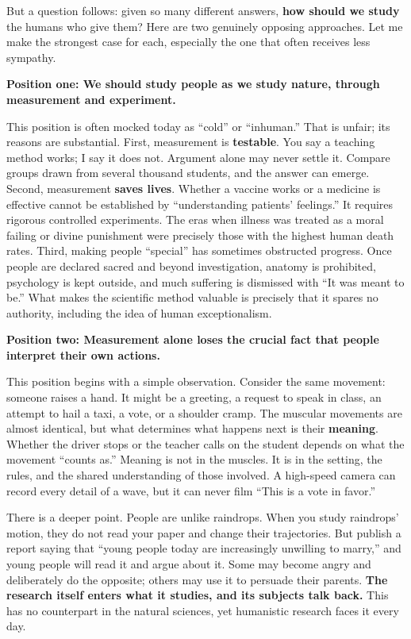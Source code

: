 But a question follows: given so many different answers, \textbf{how should we study} the humans who give them? Here are two genuinely opposing approaches. Let me make the strongest case for each, especially the one that often receives less sympathy.

\textbf{Position one: We should study people as we study nature, through measurement and experiment.}

This position is often mocked today as ``cold'' or ``inhuman.'' That is unfair; its reasons are substantial. First, measurement is \textbf{testable}. You say a teaching method works; I say it does not. Argument alone may never settle it. Compare groups drawn from several thousand students, and the answer can emerge. Second, measurement \textbf{saves lives}. Whether a vaccine works or a medicine is effective cannot be established by ``understanding patients' feelings.'' It requires rigorous controlled experiments. The eras when illness was treated as a moral failing or divine punishment were precisely those with the highest human death rates. Third, making people ``special'' has sometimes obstructed progress. Once people are declared sacred and beyond investigation, anatomy is prohibited, psychology is kept outside, and much suffering is dismissed with ``It was meant to be.'' What makes the scientific method valuable is precisely that it spares no authority, including the idea of human exceptionalism.

\textbf{Position two: Measurement alone loses the crucial fact that people interpret their own actions.}

This position begins with a simple observation. Consider the same movement: someone raises a hand. It might be a greeting, a request to speak in class, an attempt to hail a taxi, a vote, or a shoulder cramp. The muscular movements are almost identical, but what determines what happens next is their \textbf{meaning}. Whether the driver stops or the teacher calls on the student depends on what the movement ``counts as.'' Meaning is not in the muscles. It is in the setting, the rules, and the shared understanding of those involved. A high-speed camera can record every detail of a wave, but it can never film ``This is a vote in favor.''

There is a deeper point. People are unlike raindrops. When you study raindrops' motion, they do not read your paper and change their trajectories. But publish a report saying that ``young people today are increasingly unwilling to marry,'' and young people will read it and argue about it. Some may become angry and deliberately do the opposite; others may use it to persuade their parents. \textbf{The research itself enters what it studies, and its subjects talk back.} This has no counterpart in the natural sciences, yet humanistic research faces it every day.

